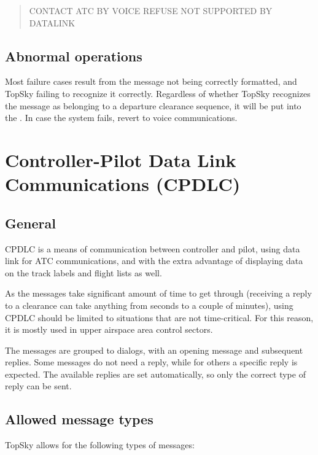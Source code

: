 \documentclass[11pt,a4paper]{memoir}
\begin{document}
\begin{quote}
  CONTACT ATC BY VOICE REFUSE NOT SUPPORTED BY DATALINK
\end{quote}

\subsection{Abnormal operations}

Most failure cases result from the message not being correctly formatted, and TopSky failing to recognize it correctly. Regardless of whether TopSky recognizes the message as belonging to a departure clearance sequence, it will be put into the \textit{}. In case the system fails, revert to voice communications.

\section{Controller-Pilot Data Link Communications (CPDLC)}
\label{cpdlc}

\subsection{General}
\label{cpdlc:gen}

CPDLC is a means of communication between controller and pilot, using data link for ATC communications, and with the extra advantage of displaying data on the track labels and flight lists as well.

As the messages take significant amount of time to get through (receiving a reply to a clearance can take anything from seconds to a couple of minutes), using CPDLC should be limited to situations that are not time-critical. For this reason, it is mostly used in upper airspace area control sectors.

The messages are grouped to dialogs, with an opening message and subsequent replies. Some messages do not need a reply, while for others a specific reply is expected. The available replies are set automatically, so only the correct type of reply can be sent.

\subsection{Allowed message types}
\label{cpdlc:amt}

TopSky allows for the following types of messages:
\end{document}

